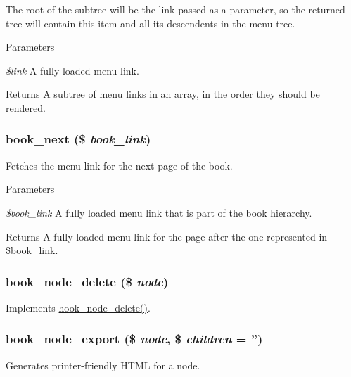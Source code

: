 The root of the subtree will be the link passed as a parameter, so the returned tree will contain this item and all its descendents in the menu tree.


\begin{DoxyParams}{Parameters}
\item[{\em \$link}]A fully loaded menu link.\end{DoxyParams}
\begin{DoxyReturn}{Returns}
A subtree of menu links in an array, in the order they should be rendered. 
\end{DoxyReturn}
\hypertarget{book_8module_a718aa9ca378d5e5086d69607f0cca000}{
\subsubsection[{book\_\-next}]{\setlength{\rightskip}{0pt plus 5cm}book\_\-next (\$ {\em book\_\-link})}}
\label{book_8module_a718aa9ca378d5e5086d69607f0cca000}
Fetches the menu link for the next page of the book.


\begin{DoxyParams}{Parameters}
\item[{\em \$book\_\-link}]A fully loaded menu link that is part of the book hierarchy.\end{DoxyParams}
\begin{DoxyReturn}{Returns}
A fully loaded menu link for the page after the one represented in \$book\_\-link. 
\end{DoxyReturn}
\hypertarget{book_8module_a67c976b971f2fe6d96cee6cf697268be}{
\subsubsection[{book\_\-node\_\-delete}]{\setlength{\rightskip}{0pt plus 5cm}book\_\-node\_\-delete (\$ {\em node})}}
\label{book_8module_a67c976b971f2fe6d96cee6cf697268be}
Implements \hyperlink{group__node__api__hooks_ga66ea0473a9950dc961802e801e5042e9}{hook\_\-node\_\-delete()}. \hypertarget{book_8module_ae395cbe677fd3e99501cd0177d89020b}{
\subsubsection[{book\_\-node\_\-export}]{\setlength{\rightskip}{0pt plus 5cm}book\_\-node\_\-export (\$ {\em node}, \/  \$ {\em children} = {\ttfamily ''})}}
\label{book_8module_ae395cbe677fd3e99501cd0177d89020b}
Generates printer-\/friendly HTML for a node.



